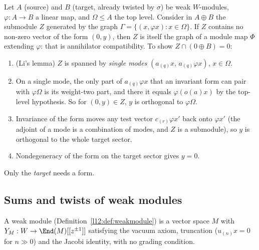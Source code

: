 Let $A$ (source) and $B$ (target, already twisted by $\sigma$) be weak $W$-modules, $\varphi:A\to B$
a linear map, and $\Omega\le A$ the top level.  Consider in $A\oplus B$ the submodule $Z$
generated by the graph $\Gamma=\{(x,\varphi x):x\in\Omega\}$.  If $Z$ contains no non-zero vector of
the form $(0,y)$, then $Z$ is itself the graph of a module map $\Phi$ extending $\varphi$: that is
annihilator compatibility.  To show $Z\cap(0\oplus B)=0$:
\begin{enumerate}
\item (Li's lemma) $Z$ is spanned by \emph{single modes} $(a_{(q)}x,\,a_{(q)}\varphi x)$, $x\in\Omega$.
\item On a single mode, the only part of $a_{(q)}\varphi x$ that an invariant form can pair with
  $\varphi\Omega$ is its weight-two part, and there it equals $\varphi(o(a)x)$ by the top-level
  hypothesis.  So for $(0,y)\in Z$, $y$ is orthogonal to $\varphi\Omega$.
\item Invariance of the form moves any test vector $c_{(r)}\varphi x'$ back onto $\varphi x'$ (the
  adjoint of a mode is a combination of modes, and $Z$ is a submodule), so $y$ is orthogonal to the
  whole target sector.
\item Nondegeneracy of the form on the target sector gives $y=0$.
\end{enumerate}
Only the \emph{target} needs a form.

\subsection{Sums and twists of weak modules}

A weak module (Definition~\ref{l12:def:weakmodule}) is a vector space $M$ with $Y_M:W\to\End(M)[[z^{\pm1}]]$
satisfying the vacuum axiom, truncation ($u_{(n)}x=0$ for $n\gg0$) and the Jacobi identity, with no
grading condition.

